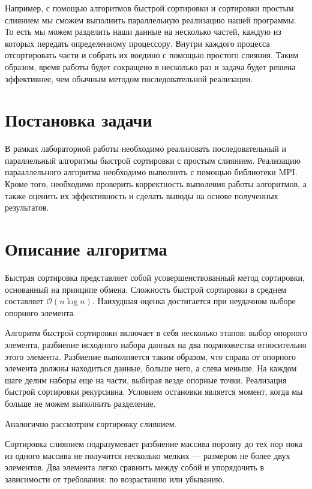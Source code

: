 \documentclass{report}
\begin{document}
\par Например, с помощью алгоритмов быстрой сортировки и сортировки простым слиянием мы сможем выполнить параллельную реализацию нашей программы. То есть мы можем разделить наши данные на несколько частей, каждую из которых передать определенному процессору. Внутри каждого процесса отсортировать части и собрать их воедино с помощью простого слияния. Таким образом, время работы будет сокращено в несколько раз и задача будет решена эффективнее, чем обычным методом последовательной реализации.

\newpage

\section*{Постановка задачи}
В рамках лабораторной работы необходимо реализовать последовательный и параллельный алгоритмы быстрой сортировки с простым слиянием. Реализацию парааллельного алгоритма необходимо выполнить с помощью библиотеки MPI. Кроме того, необходимо проверить корректность выполения работы алгоритмов, а также оценить их эффективность и сделать выводы на основе полученных результатов.
\newpage

\section*{Описание алгоритма}
Быстрая сортировка представляет собой усовершенствованный метод сортировки, основанный на принципе обмена. Сложность быстрой сортировки в среднем составляет $\mathcal{O}(n\log{}n)$. Наихудшая оценка достигается при неудачном выборе опорного элемента.

\par Алгоритм быстрой сортировки включает в себя несколько этапов: выбор опорного элемента, разбиение исходного набора данных на два подмножества относительно этого элемента. Разбиение выполняется таким образом, что справа от опорного элемента должны находиться данные, больше него, а слева меньше. На каждом шаге делим наборы еще на части, выбирая везде опорные точки. Реализация быстрой сортировки рекурсивна. Условием остановки является момент, когда мы больше не можем выполнить разделение.

\par Аналогично рассмотрим сортировку слиянием.

Сортировка слиянием подразумевает разбиение массива поровну до тех пор пока из одного массива не получится несколько мелких — размером не более двух элементов. Два элемента легко сравнить между собой и упорядочить в зависимости от требования: по возрастанию или убыванию.
\end{document}
